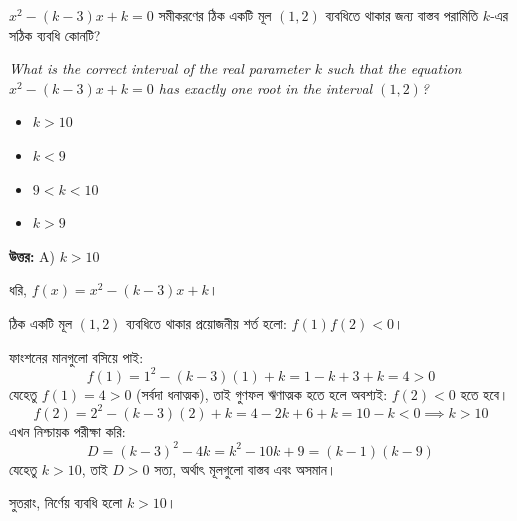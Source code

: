 \documentclass[12pt, a4paper]{article}
\begin{document}
\begin{tcolorbox}[questionbox={প্রশ্ন (Question) 43}]
    \noindent
    $x^2 - (k-3)x + k = 0$ সমীকরণের ঠিক একটি মূল $(1, 2)$ ব্যবধিতে থাকার জন্য বাস্তব পরামিতি $k$-এর সঠিক ব্যবধি কোনটি?
    
    \vspace{0.8em}
    \begin{english}
    \noindent\textit{\color{darkgray}
    What is the correct interval of the real parameter $k$ such that the equation $x^2 - (k-3)x + k = 0$ has exactly one root in the interval $(1, 2)$?
    }
    \end{english}
\end{tcolorbox}

\begin{itemize}[label={}, leftmargin=1cm, itemsep=0.5em]
    \item[\textbf{A)}] $k > 10$
    \item[\textbf{B)}] $k < 9$
    \item[\textbf{C)}] $9 < k < 10$
    \item[\textbf{D)}] $k > 9$
\end{itemize}

\vspace{0.5em}
\begin{tcolorbox}[answerbox]
    \textbf{\color{success} উত্তর:} A) $k > 10$
\end{tcolorbox}
\vspace{1em}

\begin{tcolorbox}[solutionbox={সমাধান (Solution)}]
    \noindent
    ধরি, $f(x) = x^2 - (k-3)x + k$। 
    
    ঠিক একটি মূল $(1, 2)$ ব্যবধিতে থাকার প্রয়োজনীয় শর্ত হলো: $f(1)f(2) < 0$। 
    
    ফাংশনের মানগুলো বসিয়ে পাই:
    \[ f(1) = 1^2 - (k-3)(1) + k = 1 - k + 3 + k = 4 > 0 \]
    যেহেতু $f(1) = 4 > 0$ (সর্বদা ধনাত্মক), তাই গুণফল ঋণাত্মক হতে হলে অবশ্যই: $f(2) < 0$ হতে হবে।
    \[ f(2) = 2^2 - (k-3)(2) + k = 4 - 2k + 6 + k = 10 - k < 0 \implies k > 10 \]
    এখন নিশ্চায়ক পরীক্ষা করি:
    \[ D = (k-3)^2 - 4k = k^2 - 10k + 9 = (k-1)(k-9) \]
    যেহেতু $k > 10$, তাই $D > 0$ সত্য, অর্থাৎ মূলগুলো বাস্তব এবং অসমান। 
    
    সুতরাং, নির্ণেয় ব্যবধি হলো $k > 10$।
\end{tcolorbox}
\end{document}
